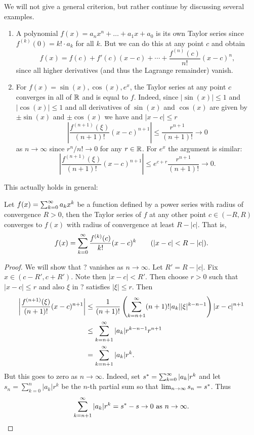 \documentclass[10pt, a4paper]{article}
\newcommand{\limas}[3][n]{#2 \rightarrow #3 \text{ as } #1 \rightarrow \infty}
\newcommand{\infsumo}{\infsum[k = 0]}
\begin{document}
We will not give a general criterion,
but rather continue by discussing several examples.
\begin{example}
    \begin{enumerate}[label = (\roman*)]
        \item A polynomial $f(x) = a_nx ^ n + \dotsc + a_1x + a_0$ is its own Taylor series since $f ^ {(k)}(0) = k! \cdot a_k$ for all $k$. But we can do this at any point $c$ and obtain
        \[
        f(x) = f(c) + f'(c)(x - c) + \dotsi + \frac{f ^ {(n)}(c)}{n!}(x - c) ^ n,
        \]
        since all higher derivatives
        (and thus the Lagrange remainder)
        vanish.

        \item For $f(x) = \sin(x), \cos(x), e ^ x$,
        the Taylor series at any point $c$ converges in all of $\R$ and is equal to $f$.
        Indeed,
        since $|\sin(x)| \leq 1$ and $|\cos(x)| \leq 1$ and all derivatives of $\sin(x)$ and $\cos(x)$ are given by $\pm\sin(x)$ and $\pm\cos(x)$ we have and $|x - c| \leq r$
        \[
        \left|\frac{f ^ {(n + 1)}(\xi)}{(n + 1)!}(x - c) ^ {n + 1}\right| \leq \frac{r ^ {n + 1}}{(n + 1)!} \rightarrow 0
        \]
        as $n \rightarrow \infty$ since $r ^ n / n! \rightarrow 0$ for any $r \in \R$.
        For $e ^ x$ the argument is similar:
        \[
        \left|\frac{f ^ {(n + 1)}(\xi)}{(n + 1)!}(x - c) ^ {n + 1}\right| \leq e ^ {c + r}\frac{r ^ {n + 1}}{(n + 1)!} \rightarrow 0.
        \]
    \end{enumerate}
\end{example}
This actually holds in general:
\begin{proposition}
    Let $f(x) = \infsumo a_kx ^ k$ be a function defined by a power series with radius of convergence $R > 0$,
    then the Taylor series of $f$ at any other point $c \in (-R, R)$ converges to $f(x)$ with radius of convergence at least $R - |c|$.
    That is,
    \[
    f(x) = \infsumo \frac{f ^ {(k)}(c)}{k!}(x - c) ^ k\qquad(|x - c| < R - |c|).
    \]
    \begin{proof}
        We will show that ? vanishes as $n \rightarrow \infty$.
        Let $R' = R - |c|$.
        Fix $x \in (c - R', c + R')$.
        Note then $|x - c| < R'$.
        Then choose $r > 0$ such that $|x - c| \leq r$ and also $\xi$ in ? satisfies $|\xi| \leq r$.
        Then
        \begin{align*}
            \left|\frac{f ^ {(n + 1)}(\xi)}{(n + 1)!}(x - c) ^ {n + 1}\right| &\leq \frac{1}{(n + 1)!}\left(\infsum[k = n + 1](n + 1)!|a_k||\xi| ^ {k - n - 1}\right)|x - c| ^ {n + 1} \\
            &\leq \infsum[k = n + 1]|a_k|r ^ {k - n - 1}r ^ {n + 1} \\
            &= \infsum[k = n + 1]|a_k|r ^ k.
        \end{align*}
        But this goes to zero as $n \rightarrow \infty$.
        Indeed,
        set $s ^ {*} = \infsumo|a_k|r ^ k$ and let $s_n = \sum_{k = 0}^{n}|a_k|r ^ k$ be the $n$-th partial sum so that $\liminfty s_n = s ^ {*}$.
        Thus
        \[
        \limas{\infsum[k = n + 1]|a_k|r ^ k = s ^ {*} - s}{0}.
        \]
    \end{proof}
\end{proposition}
\end{document}
